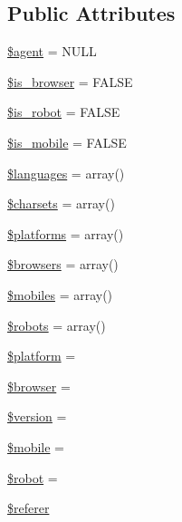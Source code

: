 \subsection*{Public Attributes}
\begin{DoxyCompactItemize}
\item 
\mbox{\hyperlink{class_c_i___user__agent_a0606e5b321c8c85527efdd1c17a9a569}{\$agent}} = N\+U\+LL
\item 
\mbox{\hyperlink{class_c_i___user__agent_af9608f790bc03edf6c152d11cd879e04}{\$is\+\_\+browser}} = F\+A\+L\+SE
\item 
\mbox{\hyperlink{class_c_i___user__agent_a4b3d4b92832b15f313661bc9af0323fa}{\$is\+\_\+robot}} = F\+A\+L\+SE
\item 
\mbox{\hyperlink{class_c_i___user__agent_a15f8c9cdaac57894151997b80f38224d}{\$is\+\_\+mobile}} = F\+A\+L\+SE
\item 
\mbox{\hyperlink{class_c_i___user__agent_a8856d0a49881ef8e0a6d205d37d4a7af}{\$languages}} = array()
\item 
\mbox{\hyperlink{class_c_i___user__agent_ae269ee30c94deb9b791c1ae5489b88f3}{\$charsets}} = array()
\item 
\mbox{\hyperlink{class_c_i___user__agent_a1c1a0a860242698ee6b3f4ef7d6eb343}{\$platforms}} = array()
\item 
\mbox{\hyperlink{class_c_i___user__agent_a81edf933083b5ac5b380385f59074a7d}{\$browsers}} = array()
\item 
\mbox{\hyperlink{class_c_i___user__agent_a6928dde5aa0be443766d5b2376de908a}{\$mobiles}} = array()
\item 
\mbox{\hyperlink{class_c_i___user__agent_a5752e2a66d1c03bc34666492746037ab}{\$robots}} = array()
\item 
\mbox{\hyperlink{class_c_i___user__agent_a9cb2b1a2275f65f39415f0366139fb1c}{\$platform}} = \textquotesingle{}\textquotesingle{}
\item 
\mbox{\hyperlink{class_c_i___user__agent_ada6112ba48917a0c8cc154ed90908b28}{\$browser}} = \textquotesingle{}\textquotesingle{}
\item 
\mbox{\hyperlink{class_c_i___user__agent_a17c8948c68aa44fa9961ae169b6a8961}{\$version}} = \textquotesingle{}\textquotesingle{}
\item 
\mbox{\hyperlink{class_c_i___user__agent_a4144d0c9c54f204811328b221f06fc3d}{\$mobile}} = \textquotesingle{}\textquotesingle{}
\item 
\mbox{\hyperlink{class_c_i___user__agent_aaf86508e45876d0081cadac4cb8a8808}{\$robot}} = \textquotesingle{}\textquotesingle{}
\item 
\mbox{\hyperlink{class_c_i___user__agent_a872d93ddbbb879ab5c0eb29261a520a4}{\$referer}}
\end{DoxyCompactItemize}
